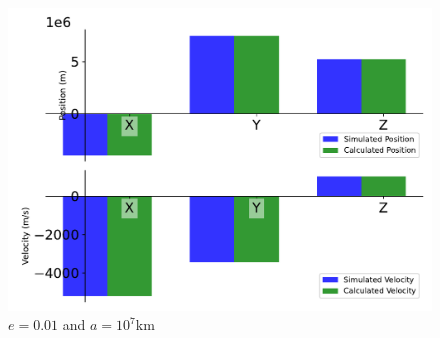 \begin{figure}[htbp]\centerline{\includegraphics[height=0.7\textwidth, keepaspectratio]{AutoTeX/IncEllip_e_1}}\caption{$e = 0.01$ and $a = 10^7$km}\label{fig:IncEllip_e_1}\end{figure}